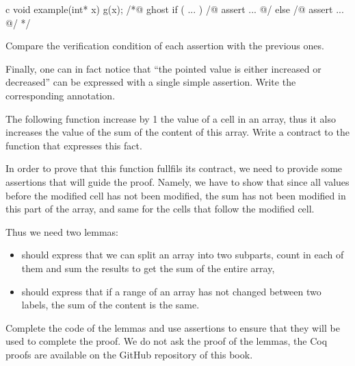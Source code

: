 \begin{CodeBlock}{c}
void example(int* x){
  g(x);
  /*@ ghost
   if ( ... ){
    /@ assert ... @/
   } else {
    /@ assert ... @/
   }
  */
}
\end{CodeBlock}

Compare the verification condition of each assertion with the previous ones.

Finally, one can in fact notice that ``the pointed value is either increased
or decreased'' can be expressed with a single simple assertion. Write the
corresponding annotation.





The following function increase by 1 the value of a cell in an array, thus it
also increases the value of the sum of the content of this array. Write a
contract to the function that expresses this fact.




In order to prove that this function fullfils its contract, we need to provide
some assertions that will guide the proof. Namely, we have to show that since
all values before the modified cell has not been modified, the sum has not been
modified in this part of the array, and same for the cells that follow the
modified cell.


Thus we need two lemmas:

\begin{itemize}
\item {} should express that we can split an array into
  two subparts, count in each of them and sum the results to get the sum of the
  entire array,
\item {} should express that if a range of an array has
  not changed between two labels, the sum of the content is the same.
\end{itemize}

Complete the code of the lemmas and use assertions to ensure that they will be
used to complete the proof. We do not ask the proof of the lemmas, the Coq
proofs are available on the GitHub repository of this book.
